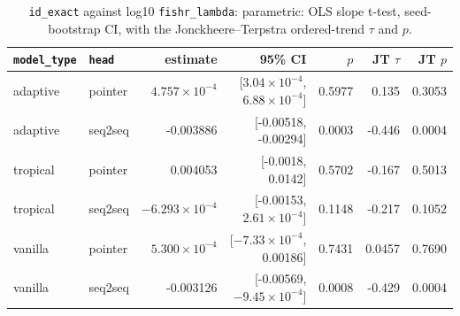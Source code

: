 \documentclass[10pt]{article}
\begin{document}
{\small
\begin{longtable}{llrrrrr}
\caption{\texttt{id\_exact} against log10 \texttt{fishr\_lambda}: parametric: OLS slope t-test, seed-bootstrap CI, with the Jonckheere--Terpstra ordered-trend $\tau$ and $p$.}\label{tab:trend-id_exact}\\
\toprule
\texttt{model\_type} & \texttt{head} & estimate & 95\% CI & $p$ & JT $\tau$ & JT $p$\\
\midrule
\endhead
adaptive & pointer & $4.757\times10^{-4}$ & [$3.04\times10^{-4}$, $6.88\times10^{-4}$] & 0.5977 & 0.135 & 0.3053\\
adaptive & seq2seq & -0.003886 & [-0.00518, -0.00294] & 0.0003 & -0.446 & 0.0004\\
tropical & pointer & 0.004053 & [-0.0018, 0.0142] & 0.5702 & -0.167 & 0.5013\\
tropical & seq2seq & $-6.293\times10^{-4}$ & [-0.00153, $2.61\times10^{-4}$] & 0.1148 & -0.217 & 0.1052\\
vanilla & pointer & $5.300\times10^{-4}$ & [$-7.33\times10^{-4}$, 0.00186] & 0.7431 & 0.0457 & 0.7690\\
vanilla & seq2seq & -0.003126 & [-0.00569, $-9.45\times10^{-4}$] & 0.0008 & -0.429 & 0.0004\\
\bottomrule
\end{longtable}
}
\end{document}
